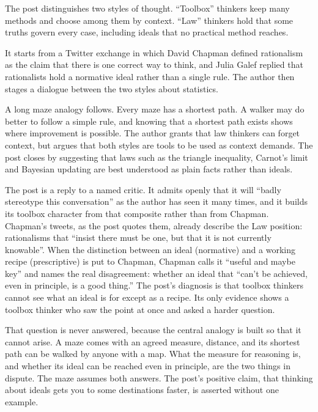 \begin{afterword}
\summaryhead

The post distinguishes two styles of thought. ``Toolbox'' thinkers keep many methods and choose among them by context. ``Law'' thinkers hold that some truths govern every case, including ideals that no practical method reaches.

It starts from a Twitter exchange in which David Chapman defined rationalism as the claim that there is one correct way to think, and Julia Galef replied that rationalists hold a normative ideal rather than a single rule. The author then stages a dialogue between the two styles about statistics.

A long maze analogy follows. Every maze has a shortest path. A walker may do better to follow a simple rule, and knowing that a shortest path exists shows where improvement is possible. The author grants that law thinkers can forget context, but argues that both styles are tools to be used as context demands. The post closes by suggesting that laws such as the triangle inequality, Carnot's limit and Bayesian updating are best understood as plain facts rather than ideals.

\responsehead

The post is a reply to a named critic. It admits openly that it will ``badly stereotype this conversation'' as the author has seen it many times, and it builds its toolbox character from that composite rather than from Chapman. Chapman's tweets, as the post quotes them, already describe the Law position: rationalisms that ``insist there must be one, but that it is not currently knowable''. When the distinction between an ideal (normative) and a working recipe (prescriptive) is put to Chapman, Chapman calls it ``useful and maybe key'' and names the real disagreement: whether an ideal that ``can't be achieved, even in principle, is a good thing.'' The post's diagnosis is that toolbox thinkers cannot see what an ideal is for except as a recipe. Its only evidence shows a toolbox thinker who saw the point at once and asked a harder question.

That question is never answered, because the central analogy is built so that it cannot arise. A maze comes with an agreed measure, distance, and its shortest path can be walked by anyone with a map. What the measure for reasoning is, and whether its ideal can be reached even in principle, are the two things in dispute. The maze assumes both answers. The post's positive claim, that thinking about ideals gets you to some destinations faster, is asserted without one example.


\end{afterword}
